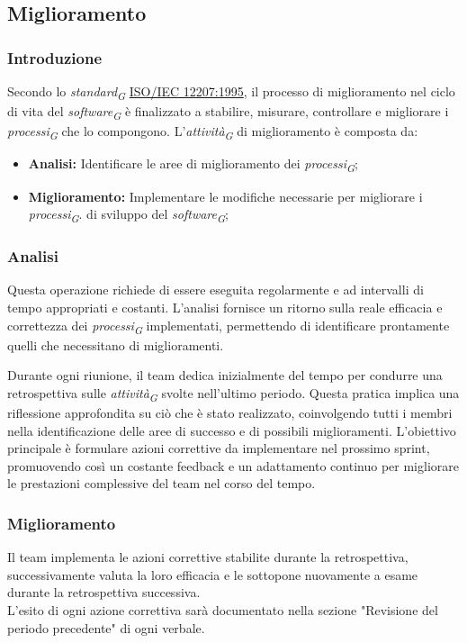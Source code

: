 \subsection{Miglioramento}
\subsubsection{Introduzione}
Secondo lo \textit{standard}\textsubscript{\textit{G}} \href{https://www.math.unipd.it/~tullio/IS-1/2009/Approfondimenti/ISO_12207-1995.pdf}{ISO/IEC 12207:1995}, il processo di miglioramento nel ciclo di vita del \textit{software}\textsubscript{\textit{G}} è finalizzato a stabilire, misurare, controllare e migliorare i \textit{processi}\textsubscript{\textit{G}} che lo compongono.
L'\textit{attività}\textsubscript{\textit{G}} di miglioramento è composta da:
 \begin{itemize}
    \item \textbf{Analisi:} Identificare le aree di miglioramento dei \textit{processi}\textsubscript{\textit{G}}; 
    \item  \textbf{Miglioramento:} Implementare le modifiche necessarie per migliorare i \textit{processi}\textsubscript{\textit{G}}. 
    di sviluppo del \textit{software}\textsubscript{\textit{G}};
 \end{itemize}
 \subsubsection{Analisi}
Questa operazione richiede di essere eseguita regolarmente e ad intervalli di tempo appropriati e costanti. L'analisi fornisce un ritorno sulla reale efficacia e correttezza dei \textit{processi}\textsubscript{\textit{G}} implementati, permettendo di identificare prontamente quelli che necessitano di miglioramenti.

\vspace*{0.1cm}

Durante ogni riunione, il team dedica inizialmente del tempo per condurre una retrospettiva sulle \textit{attività}\textsubscript{\textit{G}} svolte nell'ultimo periodo. Questa pratica implica una riflessione approfondita su ciò che è stato realizzato, coinvolgendo tutti i membri nella identificazione delle aree di successo e di possibili miglioramenti. L'obiettivo principale è formulare azioni correttive da implementare nel prossimo sprint, promuovendo così un costante feedback e un adattamento continuo per migliorare le prestazioni complessive del team nel corso del tempo. 
 \subsubsection{Miglioramento}
 Il team implementa le azioni correttive stabilite durante la retrospettiva, successivamente valuta la loro efficacia e le sottopone nuovamente a esame durante la retrospettiva successiva.\\
L'esito di ogni azione correttiva sarà documentato nella sezione "Revisione del periodo precedente" di ogni verbale. 
